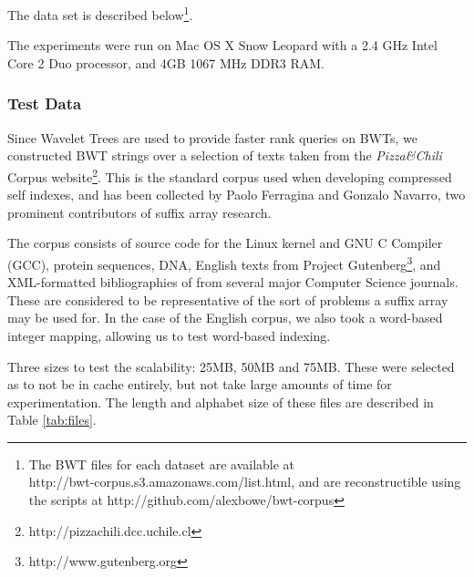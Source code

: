 The data set is described below\footnote{The BWT files for each dataset are 
available at\\ http://bwt-corpus.s3.amazonaws.com/list.html, and are 
reconstructible using the scripts at http://github.com/alexbowe/bwt-corpus}.

The experiments were run on Mac OS X Snow Leopard with a 2.4 GHz Intel Core 2
Duo processor, and 4GB 1067 MHz DDR3 RAM.

\subsubsection{Test Data}
Since Wavelet Trees are used to provide faster rank queries on BWTs, we
constructed BWT strings over a selection of texts taken from the \emph{Pizza\&Chili}
Corpus website\footnote{http://pizzachili.dcc.uchile.cl}. This is the standard
corpus used when developing compressed self indexes, and has been collected by
Paolo Ferragina and Gonzalo Navarro, two prominent contributors of suffix array 
research.

The corpus consists of source code for the Linux kernel and GNU C Compiler
(GCC), protein sequences, DNA, English texts from Project
Gutenberg\footnote{http://www.gutenberg.org}, and XML-formatted bibliographies
of from several major Computer Science journals. These are considered to be
representative of the sort of problems a suffix array may be used for. In the 
case of the English corpus, we also took a word-based integer mapping, allowing 
us to test word-based indexing.

Three sizes to test the scalability: 25MB, 50MB and 75MB. These were selected as 
to not be in cache entirely, but not take large amounts of time
for experimentation. The length and alphabet size of these files are described 
in Table \ref{tab:files}.

